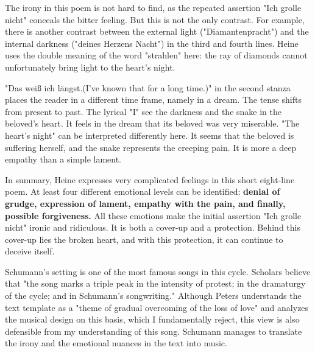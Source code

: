 \documentclass[10pt,a4paper,twocolumn]{rho}
\begin{document}
The irony in this poem is not hard to find, as the repeated assertion "Ich grolle nicht" conceals the bitter feeling. But this is not the only contrast. For example, there is another contrast between the external light ("Diamantenpracht") and the internal darkness ("deines Herzens Nacht") in the third and fourth lines. Heine uses the double meaning of the word "strahlen" here: the ray of diamonds cannot unfortunately bring light to the heart's night. 

"Das weiß ich längst.(I’ve known that for a long time.)" in the second stanza places the reader in a different time frame, namely in a dream. The tense shifts from present to past. The lyrical "I" see the darkness and the snake in the beloved's heart. It feels in the dream that its beloved was very miserable. "The heart's night" can be interpreted differently here. It seems that the beloved is suffering herself, and the snake represents the creeping pain. It is more a deep empathy than a simple lament.

In summary, Heine expresses very complicated feelings in this short eight-line poem. At least four different emotional levels can be identified: \textbf{denial of grudge, expression of lament, empathy with the pain, and finally, possible forgiveness.} All these emotions make the initial assertion "Ich grolle nicht" ironic and ridiculous. It is both a cover-up and a protection. Behind this cover-up lies the broken heart, and with this protection, it can continue to deceive itself.

Schumann's setting is one of the most famous songs in this cycle. Scholars believe that "the song marks a triple peak in the intensity of protest; in the dramaturgy of the cycle; and in Schumann's songwriting." Although Peters understands the text template as a "theme of gradual overcoming of the loss of love" and analyzes the musical design on this basis, which I fundamentally reject, this view is also defensible from my understanding of this song. Schumann manages to translate the irony and the emotional nuances in the text into music.
\end{document}
